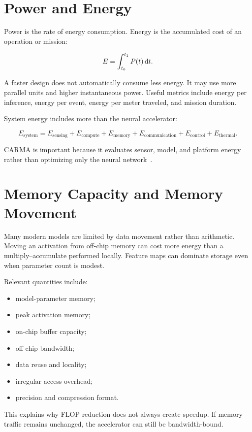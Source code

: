 \section{Power and Energy}

Power is the rate of energy consumption. Energy is the accumulated cost of an operation or mission:

\[
    E = \int_{t_0}^{t_1} P(t)\,\mathrm{d} t.
\]

A faster design does not automatically consume less energy. It may use more parallel units and higher instantaneous power. Useful metrics include energy per inference, energy per event, energy per meter traveled, and mission duration.

System energy includes more than the neural accelerator:

\[
E_{\text{system}}
= E_{\text{sensing}}
+ E_{\text{compute}}
+ E_{\text{memory}}
+ E_{\text{communication}}
+ E_{\text{control}}
+ E_{\text{thermal}}.
\]

CARMA is important because it evaluates sensor, model, and platform energy rather than optimizing only the neural network~\cite{zhang2023carma}.

\section{Memory Capacity and Memory Movement}

Many modern models are limited by data movement rather than arithmetic. Moving an activation from off-chip memory can cost more energy than a multiply--accumulate performed locally. Feature maps can dominate storage even when parameter count is modest.

Relevant quantities include:

\begin{itemize}
    \item model-parameter memory;
    \item peak activation memory;
    \item on-chip buffer capacity;
    \item off-chip bandwidth;
    \item data reuse and locality;
    \item irregular-access overhead;
    \item precision and compression format.
\end{itemize}

This explains why FLOP reduction does not always create speedup. If memory traffic remains unchanged, the accelerator can still be bandwidth-bound.

